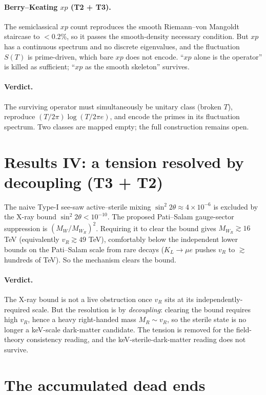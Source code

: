 \documentclass[11pt]{article}
\begin{document}
\paragraph{Berry--Keating $xp$ (T2 + T3).} The semiclassical $xp$ count reproduces the
smooth Riemann--von Mangoldt staircase to $<0.2\%$, so it passes the smooth-density
necessary condition. But $xp$ has a continuous spectrum and no discrete eigenvalues, and
the fluctuation $S(T)$ is prime-driven, which bare $xp$ does not encode. ``$xp$ alone is
the operator'' is killed as sufficient; ``$xp$ as the smooth skeleton'' survives.

\paragraph{Verdict.} The surviving operator must simultaneously be unitary class (broken
$T$), reproduce $(T/2\pi)\log(T/2\pi e)$, and encode the primes in its fluctuation
spectrum. Two classes are mapped empty; the full construction remains open.

\section{Results IV: a tension resolved by decoupling (T3 + T2)}
\label{sec:q7}

The naive Type-I see-saw active--sterile mixing $\sin^2 2\theta\approx4\times10^{-6}$ is
excluded by the X-ray bound $\sin^2 2\theta<10^{-10}$. The proposed Pati--Salam
gauge-sector suppression is $(M_W/M_{W_R})^2$. Requiring it to clear the bound gives
$M_{W_R}\gtrsim 16$ TeV (equivalently $v_R\gtrsim 49$ TeV), comfortably below the
independent lower bounds on the Pati--Salam scale from rare decays
($K_L\to\mu e$ pushes $v_R$ to $\gtrsim$ hundreds of TeV). So the mechanism clears the
bound.

\paragraph{Verdict.} The X-ray bound is not a live obstruction once $v_R$ sits at its
independently-required scale. But the resolution is by \emph{decoupling}: clearing the
bound requires high $v_R$, hence a heavy right-handed mass $M_R\sim v_R$, so the sterile
state is no longer a keV-scale dark-matter candidate. The tension is removed for the
field-theory consistency reading, and the keV-sterile-dark-matter reading does not
survive.

\section{The accumulated dead ends}
\label{sec:deadends}
\end{document}
